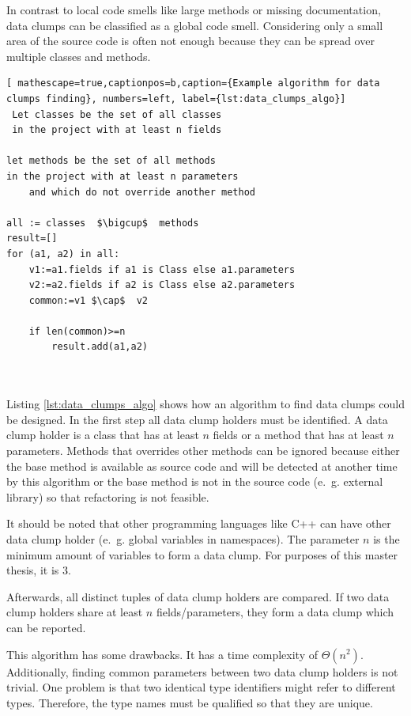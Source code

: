 In contrast to local code smells like large methods or missing documentation, data clumps can be classified as a global code smell. Considering only a small area of the source code is often not enough because they can be spread over multiple classes and methods. 

 \begin{lstlisting}[ mathescape=true,captionpos=b,caption={Example algorithm for data clumps finding}, numbers=left, label={lst:data_clumps_algo}]
 Let classes be the set of all classes
 in the project with at least n fields
 
let methods be the set of all methods
in the project with at least n parameters
	and which do not override another method
 
all := classes  $\bigcup$  methods
result=[]
for (a1, a2) in all:
	v1:=a1.fields if a1 is Class else a1.parameters
	v2:=a2.fields if a2 is Class else a2.parameters
	common:=v1 $\cap$  v2
	
	if len(common)>=n
		result.add(a1,a2)
	
	
\end{lstlisting}

Listing \ref{lst:data_clumps_algo} shows how an algorithm to find data clumps could be designed. In the first step all data clump holders must be identified.
A data clump holder is a class that has at least $n$ fields or a method that has at least $n$ parameters.  Methods that overrides other methods can be ignored because either the base method is available as source code and will be detected at another time by this algorithm or the base method is not in the source code (e.~g. external library) so that refactoring is not feasible. 

It should be noted that other programming languages like C++ can have other data clump holder (e.~g. global variables in namespaces). 
The parameter $n$ is the minimum amount of variables to form a data clump. For purposes of this master thesis, it is 3.  

Afterwards, all distinct tuples of data clump holders are compared. If two data clump holders share at least $n$ fields/parameters, they form a data clump which can be reported. 

This algorithm has some drawbacks. It has a time complexity of $\Theta(n^2)$. Additionally, finding common parameters between two data clump holders is not trivial. One problem is that two identical type identifiers might refer to different types. Therefore, the type names must be qualified so that they are unique.
  
